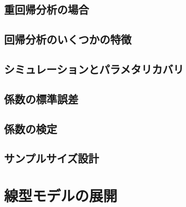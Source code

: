 \documentclass[
  a4paper,
]{ltjsbook}
\begin{document}
\hypertarget{ux91cdux56deux5e30ux5206ux6790ux306eux5834ux5408}{%
\section{重回帰分析の場合}\label{ux91cdux56deux5e30ux5206ux6790ux306eux5834ux5408}}

\hypertarget{ux56deux5e30ux5206ux6790ux306eux3044ux304fux3064ux304bux306eux7279ux5fb4}{%
\section{回帰分析のいくつかの特徴}\label{ux56deux5e30ux5206ux6790ux306eux3044ux304fux3064ux304bux306eux7279ux5fb4}}

\hypertarget{ux30b7ux30dfux30e5ux30ecux30fcux30b7ux30e7ux30f3ux3068ux30d1ux30e9ux30e1ux30bfux30eaux30abux30d0ux30ea}{%
\section{シミュレーションとパラメタリカバリ}\label{ux30b7ux30dfux30e5ux30ecux30fcux30b7ux30e7ux30f3ux3068ux30d1ux30e9ux30e1ux30bfux30eaux30abux30d0ux30ea}}

\hypertarget{ux4fc2ux6570ux306eux6a19ux6e96ux8aa4ux5dee}{%
\section{係数の標準誤差}\label{ux4fc2ux6570ux306eux6a19ux6e96ux8aa4ux5dee}}

\hypertarget{ux4fc2ux6570ux306eux691cux5b9a}{%
\section{係数の検定}\label{ux4fc2ux6570ux306eux691cux5b9a}}

\hypertarget{ux30b5ux30f3ux30d7ux30ebux30b5ux30a4ux30baux8a2dux8a08}{%
\section{サンプルサイズ設計}\label{ux30b5ux30f3ux30d7ux30ebux30b5ux30a4ux30baux8a2dux8a08}}


\hypertarget{ux7ddaux578bux30e2ux30c7ux30ebux306eux5c55ux958b}{%
\chapter{線型モデルの展開}\label{ux7ddaux578bux30e2ux30c7ux30ebux306eux5c55ux958b}}
\end{document}
